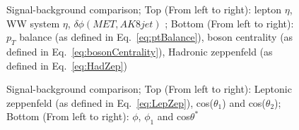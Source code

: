 \begin{figure}[h!]
	 \centering
	 \caption{Signal-background comparison; Top (From left to right): lepton $\eta$, WW system $\eta$, $\delta \phi (MET, AK8 jet)$ ; Bottom (From left to right): $p_T$ balance (as defined in Eq.~\ref{eq:ptBalance}), boson centrality (as defined in Eq.~\ref{eq:bosonCentrality}), Hadronic zeppenfeld (as defined in Eq.~\ref{eq:HadZep})}
\end{figure}
\begin{figure}[h!]\ContinuedFloat
	 \caption{Signal-background comparison; Top (From left to right): Leptonic zeppenfeld (as defined in Eq.~\ref{eq:LepZep}), cos($\theta_1$) and cos($\theta_2$); Bottom (From left to right): $\phi$, $\phi_1$ and cos$\theta^{\ast}$ }
\end{figure}


